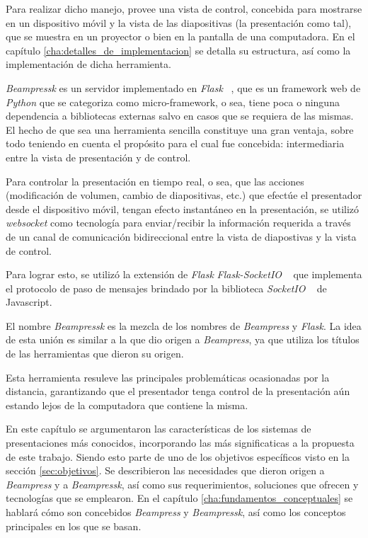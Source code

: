 		Para realizar dicho manejo, provee una vista de control, concebida para mostrarse en un dispositivo móvil y la vista de las diapositivas (la presentación como tal), que se muestra en un proyector o bien en la pantalla de una computadora. En el capítulo \ref{cha:detalles_de_implementacion} se detalla su estructura, así como la implementación de dicha herramienta.

		\textit{Beampressk} es un servidor implementado en \textit{Flask} ~\cite{flask}, que es un framework web de \textit{Python} que se categoriza como micro-framework, o sea, tiene poca o ninguna dependencia a bibliotecas externas salvo en casos que se requiera de las mismas. El hecho de que sea una herramienta sencilla constituye una gran ventaja, sobre todo teniendo en cuenta el propósito para el cual fue concebida: intermediaria entre la vista de presentación y de control.

		Para controlar la presentación en tiempo real, o sea, que las acciones (modificación de volumen, cambio de diapositivas, etc.) que efectúe el presentador desde el dispositivo móvil, tengan efecto instantáneo en la presentación, se utilizó \textit{websocket} como tecnología para enviar/recibir la información requerida a través de un canal de comunicación bidireccional entre la vista de diapostivas y la vista de control.

		Para lograr esto, se utilizó la extensión de \textit{Flask} \textit{Flask-SocketIO} ~\cite{flasksocket} que implementa el protocolo de paso de mensajes brindado por la biblioteca \textit{SocketIO} ~\cite{socketio} de Javascript.

		El nombre \textit{Beampressk} es la mezcla de los nombres de \textit{Beampress} y \textit{Flask}. La idea de esta unión es similar a la que dio origen a \textit{Beampress}, ya que utiliza los títulos de las herramientas que dieron su origen.

		Esta herramienta resuleve las principales problemáticas ocasionadas por la distancia, garantizando que el presentador tenga control de la presentación aún estando lejos de la computadora que contiene la misma.

		En este capítulo se argumentaron las características de los sistemas de presentaciones más conocidos, incorporando las más significaticas a la propuesta de este trabajo. Siendo esto parte de uno de los objetivos específicos visto en la sección \ref{sec:objetivos}. Se describieron las necesidades que dieron origen a \textit{Beampress} y a \textit{Beampressk}, así como sus requerimientos, soluciones que ofrecen y tecnologías que se emplearon. En el capítulo \ref{cha:fundamentos_conceptuales} se hablará cómo son concebidos \textit{Beampress} y \textit{Beampressk}, así como los conceptos principales en los que se basan.







